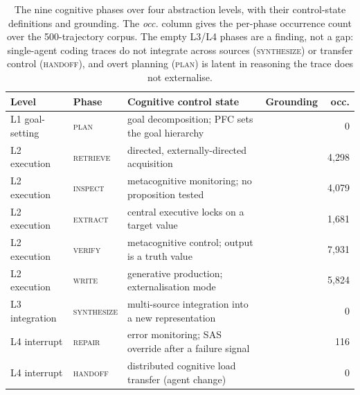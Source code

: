 \documentclass[11pt]{article}
\begin{document}
\begin{table}[t]
\centering\small
\begin{tabular}{@{}l l p{5.4cm} l r@{}}
\toprule
Level & Phase & Cognitive control state & Grounding & occ. \\
\midrule
L1 goal-setting & \textsc{plan}       & goal decomposition; PFC sets the goal hierarchy            & \cite{miller2001,grosz1986}      & 0 \\
\addlinespace[1pt]
L2 execution    & \textsc{retrieve}   & directed, externally-directed acquisition                 & \cite{botvinick2009}             & 4{,}298 \\
L2 execution    & \textsc{inspect}    & metacognitive monitoring; no proposition tested           & \cite{nelson1990}                & 4{,}079 \\
L2 execution    & \textsc{extract}    & central executive locks on a target value                 & \cite{baddeley2000}              & 1{,}681 \\
L2 execution    & \textsc{verify}     & metacognitive control; output is a truth value            & \cite{nelson1990,wason1960}      & 7{,}931 \\
L2 execution    & \textsc{write}      & generative production; externalisation mode               & \cite{flower1981}                & 5{,}824 \\
\addlinespace[1pt]
L3 integration  & \textsc{synthesize} & multi-source integration into a new representation        & \cite{hutchins1995}              & 0 \\
\addlinespace[1pt]
L4 interrupt    & \textsc{repair}     & error monitoring; SAS override after a failure signal     & \cite{norman1986}                & 116 \\
L4 interrupt    & \textsc{handoff}    & distributed cognitive load transfer (agent change)        & \cite{hutchins1995,monsell2003}  & 0 \\
\bottomrule
\end{tabular}
\caption{The nine cognitive phases over four abstraction levels, with their control-state
definitions and grounding. The \emph{occ.} column gives the per-phase occurrence count over the
500-trajectory corpus. The empty L3/L4 phases are a finding, not a gap: single-agent coding traces
do not integrate across sources (\textsc{synthesize}) or transfer control (\textsc{handoff}), and
overt planning (\textsc{plan}) is latent in reasoning the trace does not externalise.}
\label{tab:phases}
\end{table}
\end{document}
